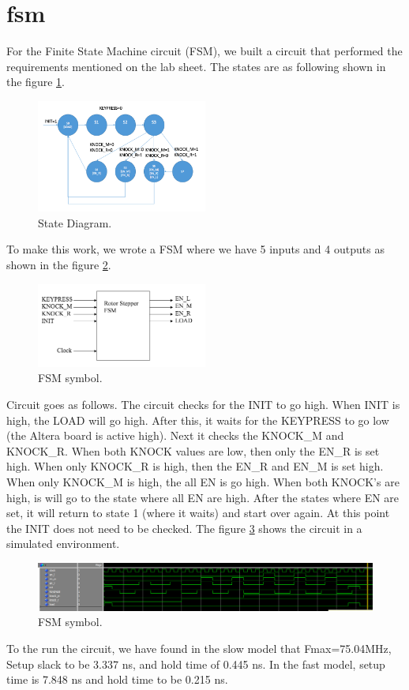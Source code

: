 \documentclass[10pt]{article}
\begin{document}
\section{fsm}
For the Finite State Machine circuit (FSM), we built a circuit that performed the requirements mentioned on the lab sheet. The states are as following shown in the figure \ref{fig:state_diagram}.
\begin{figure}[!htb]
    \centering
    \includegraphics[width=0.5\textwidth]{./state_diagram.png}
    \caption{State Diagram.}
    \label{fig:state_diagram}
\end{figure}
To make this work, we wrote a FSM where we have 5 inputs and 4 outputs as shown in the figure \ref{fig:FSM}.
\begin{figure}[!htb]
    \centering
    \includegraphics[width=0.5\textwidth]{./FSM.png}
    \caption{FSM symbol.}
    \label{fig:FSM}
\end{figure}
Circuit goes as follows. The circuit checks for the INIT to go high. When INIT is high, the LOAD will go high. After this, it waits for the KEYPRESS to go low (the Altera board is active high). Next it checks the KNOCK\_M and KNOCK\_R. When both KNOCK values are low, then only the EN\_R is set high. When only KNOCK\_R is high, then the EN\_R and EN\_M is set high. When only KNOCK\_M is high, the all EN is go high. When both KNOCK's are high, is will go to the state where all EN are high. After the states where EN are set, it will return to state 1 (where it waits) and start over again. At this point the INIT does not need to be checked. The figure \ref{fig:fsm_test} shows the circuit in a simulated environment.
\begin{figure}[!htb]
    \centering
    \includegraphics[width=1\textwidth]{./fsm_test.png}
    \caption{FSM symbol.}
    \label{fig:fsm_test}
\end{figure}
To the run the circuit, we have found in the slow model that Fmax=75.04MHz, Setup slack to be 3.337 ns, and hold time of 0.445 ns. In the fast model, setup time is 7.848 ns and hold time to be 0.215 ns. 
\end{document}
